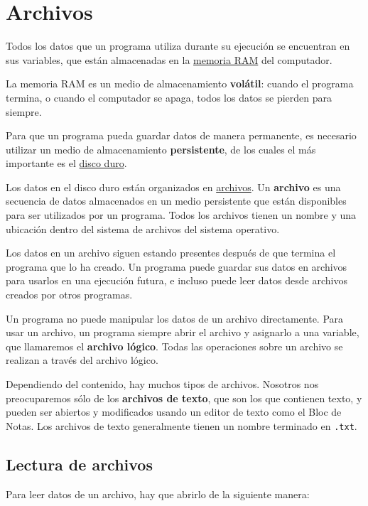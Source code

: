 \chapter{Archivos}

Todos los datos que un programa utiliza durante su ejecución se
encuentran en sus variables, que están almacenadas en la
\href{http://es.wikipedia.org/wiki/Memoria\_RAM}{memoria RAM} del
computador.

La memoria RAM es un medio de almacenamiento \textbf{volátil}: cuando el
programa termina, o cuando el computador se apaga, todos los datos se
pierden para siempre.

Para que un programa pueda guardar datos de manera permanente, es
necesario utilizar un medio de almacenamiento \textbf{persistente}, de
los cuales el más importante es el
\href{http://es.wikipedia.org/wiki/Disco\_duro}{disco duro}.

Los datos en el disco duro están organizados en
\href{http://es.wikipedia.org/wiki/Archivo\_(informática)}{archivos}. Un
\textbf{archivo} es una secuencia de datos almacenados en un medio
persistente que están disponibles para ser utilizados por un programa.
Todos los archivos tienen un nombre y una ubicación dentro del sistema
de archivos del sistema operativo.

Los datos en un archivo siguen estando presentes después de que termina
el programa que lo ha creado. Un programa puede guardar sus datos en
archivos para usarlos en una ejecución futura, e incluso puede leer
datos desde archivos creados por otros programas.

Un programa no puede manipular los datos de un archivo directamente.
Para usar un archivo, un programa siempre abrir el archivo y asignarlo a
una variable, que llamaremos el \textbf{archivo lógico}. Todas las
operaciones sobre un archivo se realizan a través del archivo lógico.

Dependiendo del contenido, hay muchos tipos de archivos. Nosotros nos
preocuparemos sólo de los \textbf{archivos de texto}, que son los que
contienen texto, y pueden ser abiertos y modificados usando un editor de
texto como el Bloc de Notas. Los archivos de texto generalmente tienen
un nombre terminado en \lstinline!.txt!.

\section{Lectura de archivos}

Para leer datos de un archivo, hay que abrirlo de la siguiente manera:

